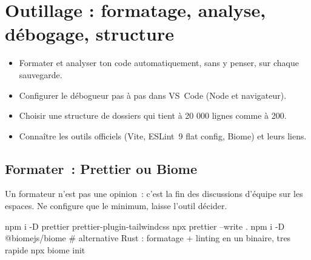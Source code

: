 \documentclass[12pt,a4paper,twoside,openright]{book}
\begin{document}
\chapter{Outillage : formatage, analyse, d\'ebogage, structure}
\label{ch-js-outils}

\begin{objectif}
\begin{itemize}
  \item Formater et analyser ton code automatiquement, sans y penser, sur chaque sauvegarde.
  \item Configurer le d\'ebogueur pas \`a pas dans VS~Code (Node et navigateur).
  \item Choisir une structure de dossiers qui tient \`a 20 000 lignes comme \`a 200.
  \item Conna\^itre les outils officiels (Vite, ESLint~9 flat config, Biome) et leurs liens.
\end{itemize}
\end{objectif}

\section{Formater~: Prettier ou Biome}

Un formateur n'est pas une opinion~: c'est la fin des discussions d'\'equipe sur les espaces.
Ne configure que le minimum, laisse l'outil d\'ecider.

\begin{terminal}
npm i -D prettier prettier-plugin-tailwindcss
npx prettier --write .
npm i -D @biomejs/biome          # alternative Rust : formatage + linting en un binaire, tres rapide
npx biome init
\end{terminal}

\end{document}
